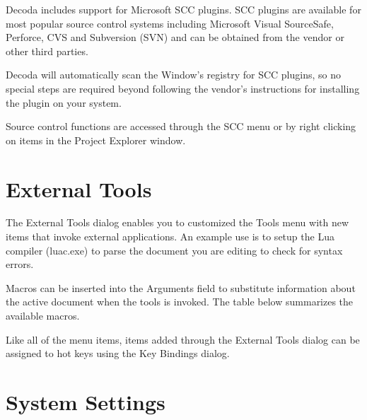 
Decoda includes support for Microsoft SCC plugins.  SCC plugins are available for most popular
source control systems including Microsoft Visual SourceSafe, Perforce, CVS and Subversion (SVN) and
can be obtained from the vendor or other third parties.

Decoda will automatically scan the Window's registry for SCC plugins, so no special steps are
required beyond following the vendor's instructions for installing the plugin on your system.

Source control functions are accessed through the SCC menu or by right clicking on items in the
Project Explorer window.

\section{External Tools}\label{external_tools}


The External Tools dialog enables you to customized the Tools menu with new items that
invoke external applications.  An example use is to setup the Lua compiler (luac.exe) to
parse the document you are editing to check for syntax errors.

Macros can be inserted into the Arguments field to substitute information about the active
document when the tools is invoked. The table below summarizes the available macros. 

\begin{twocollist}
\end{twocollist}

Like all of the menu items, items added through the External Tools dialog can be assigned to
hot keys using the Key Bindings dialog.

\section{System Settings}\label{system_settings}

